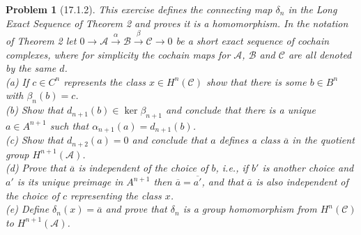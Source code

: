 \documentclass{article}
\newtheorem{problem}{Problem}
\begin{document}

\begin{problem}[17.1.2]
\label{wd}
This exercise defines the connecting map $\delta_n$ in the Long Exact Sequence of Theorem 2 and proves it is a homomorphism. In the notation of Theorem 2 let $0 \to \mathcal{A} \stackrel{\alpha}{\to} \mathcal{B} \stackrel{\beta}{\to} \mathcal{C} \to 0$ be a short exact sequence of cochain complexes, where for simplicity the cochain maps for $\mathcal{A}$, $\mathcal{B}$ and $\mathcal{C}$ are all denoted by the same $d$.\\
(a) If $c \in C^n$ represents the class $x \in H^n(\mathcal{C})$ show that there is some $b \in B^n$ with $\beta_n(b) = c$.\\
(b) Show that $d_{n+1}(b) \in \ker \beta_{n+1}$ and conclude that there is a unique $a \in A^{n+1}$ such that $\alpha_{n+1}(a) = d_{n+1}(b)$.\\
(c) Show that $d_{n+2}(a) = 0$ and conclude that $a$ defines a class $\overline{a}$ in the quotient group $H^{n+1}(\mathcal{A})$.\\
(d) Prove that $\overline{a}$ is independent of the choice of $b$, i.e., if $b'$ is another choice and $a'$ is its unique preimage in $A^{n+1}$ then $\overline{a} = \overline{a'}$, and that $\overline{a}$ is also independent of the choice of $c$ representing the class $x$.\\
(e) Define $\delta_n(x) = \overline{a}$ and prove that $\delta_n$ is a group homomorphism from $H^n(\mathcal{C})$ to $H^{n+1}(\mathcal{A})$.
\end{problem}
\end{document}

